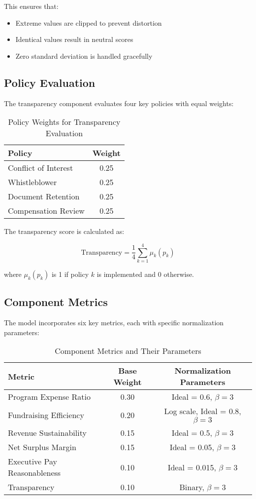 \documentclass[12pt]{article}
\begin{document}
This ensures that:
\begin{itemize}
    \item Extreme values are clipped to prevent distortion
    \item Identical values result in neutral scores
    \item Zero standard deviation is handled gracefully
\end{itemize}

\subsection{Policy Evaluation}

The transparency component evaluates four key policies with equal weights:

\begin{table}[h]
\centering
\begin{tabular}{|l|c|}
\hline
\textbf{Policy} & \textbf{Weight} \\
\hline
Conflict of Interest & 0.25 \\
Whistleblower & 0.25 \\
Document Retention & 0.25 \\
Compensation Review & 0.25 \\
\hline
\end{tabular}
\caption{Policy Weights for Transparency Evaluation}
\label{tab:policy_weights}
\end{table}

The transparency score is calculated as:

\begin{equation}
    \text{Transparency} = \frac{1}{4}\sum_{k=1}^{4} \mu_k(p_k)
\end{equation}

where $\mu_k(p_k)$ is 1 if policy $k$ is implemented and 0 otherwise.

\subsection{Component Metrics}

The model incorporates six key metrics, each with specific normalization parameters:

\begin{table}[h]
\centering
\begin{tabular}{|l|c|c|}
\hline
\textbf{Metric} & \textbf{Base Weight} & \textbf{Normalization Parameters} \\
\hline
Program Expense Ratio & 0.30 & Ideal = 0.6, $\beta = 3$ \\
Fundraising Efficiency & 0.20 & Log scale, Ideal = 0.8, $\beta = 3$ \\
Revenue Sustainability & 0.15 & Ideal = 0.5, $\beta = 3$ \\
Net Surplus Margin & 0.15 & Ideal = 0.05, $\beta = 3$ \\
Executive Pay Reasonableness & 0.10 & Ideal = 0.015, $\beta = 3$ \\
Transparency & 0.10 & Binary, $\beta = 3$ \\
\hline
\end{tabular}
\caption{Component Metrics and Their Parameters}
\label{tab:metrics}
\end{table}
\end{document}
